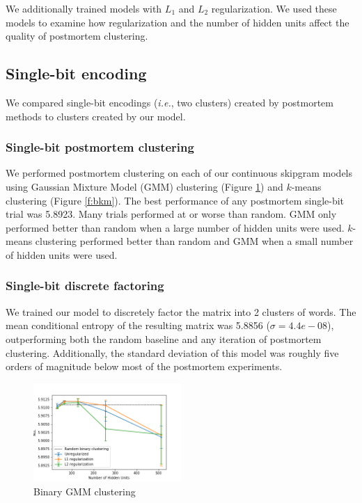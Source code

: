 \documentclass[11pt,letterpaper]{article}
\begin{document}
We additionally trained models with $L_1$ and $L_2$ regularization. We used these models to examine how regularization and the number of hidden units affect the quality of postmortem clustering. 

\subsection{Single-bit encoding}

We compared single-bit encodings (\textit{i.e.}, two clusters) created by postmortem methods to clusters created by our model.

\subsubsection{Single-bit postmortem clustering}
We performed postmortem clustering on each of our continuous skipgram models using Gaussian Mixture Model (GMM) clustering (Figure \ref{f:bgmm}) and $k$-means clustering (Figure \ref{f:bkm}). The best performance of any postmortem single-bit trial was 5.8923. Many trials performed at or worse than random. GMM only performed better than random when a large number of hidden units were used. $k$-means clustering performed better than random and GMM when a small number of hidden units were used.

\subsubsection{Single-bit discrete factoring}
We trained our model to discretely factor the matrix into 2 clusters of words. The mean conditional entropy of the resulting matrix was 5.8856 ($\sigma=4.4e-08$), outperforming both the random baseline and any iteration of postmortem clustering. Additionally, the standard deviation of this model was roughly five orders of magnitude below most of the postmortem experiments.

\begin{figure}
  \caption{Binary GMM clustering}
\label{f:bgmm}
  \centering
    \includegraphics[width=0.5\textwidth]{binary_gmm.png}
\end{figure}
\end{document}
